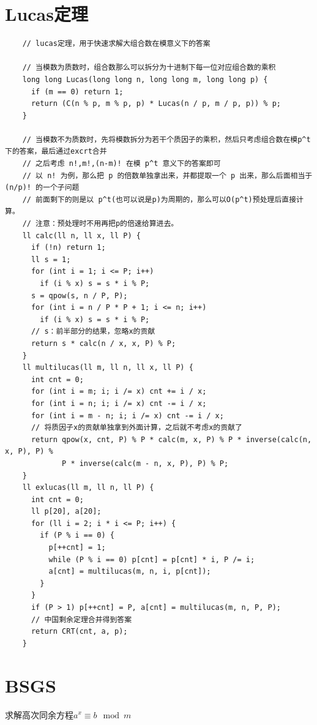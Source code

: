 \documentclass[a4paper,11pt,twoside,fontset = fandol,UTF8]{ctexbook} %
\begin{document}
	\section{Lucas定理}
	
	\begin{lstlisting}
	// lucas定理，用于快速求解大组合数在模意义下的答案
	
	// 当模数为质数时，组合数那么可以拆分为十进制下每一位对应组合数的乘积
	long long Lucas(long long n, long long m, long long p) {
	  if (m == 0) return 1;
	  return (C(n % p, m % p, p) * Lucas(n / p, m / p, p)) % p;
	}
	
	// 当模数不为质数时，先将模数拆分为若干个质因子的乘积，然后只考虑组合数在模p^t下的答案，最后通过excrt合并
	// 之后考虑 n!,m!,(n-m)! 在模 p^t 意义下的答案即可
	// 以 n! 为例，那么把 p 的倍数单独拿出来，并都提取一个 p 出来，那么后面相当于 (n/p)! 的一个子问题
	// 前面剩下的则是以 p^t(也可以说是p)为周期的，那么可以O(p^t)预处理后直接计算。
	// 注意：预处理时不用再把p的倍速给算进去。
	ll calc(ll n, ll x, ll P) {
	  if (!n) return 1;
	  ll s = 1;
	  for (int i = 1; i <= P; i++)
	    if (i % x) s = s * i % P;
	  s = qpow(s, n / P, P);
	  for (int i = n / P * P + 1; i <= n; i++)
	    if (i % x) s = s * i % P;
	  // s：前半部分的结果，忽略x的贡献
	  return s * calc(n / x, x, P) % P;
	}
	ll multilucas(ll m, ll n, ll x, ll P) {
	  int cnt = 0;
	  for (int i = m; i; i /= x) cnt += i / x;
	  for (int i = n; i; i /= x) cnt -= i / x;
	  for (int i = m - n; i; i /= x) cnt -= i / x;
	  // 将质因子x的贡献单独拿到外面计算，之后就不考虑x的贡献了
	  return qpow(x, cnt, P) % P * calc(m, x, P) % P * inverse(calc(n, x, P), P) %
	         P * inverse(calc(m - n, x, P), P) % P;
	}
	ll exlucas(ll m, ll n, ll P) {
	  int cnt = 0;
	  ll p[20], a[20];
	  for (ll i = 2; i * i <= P; i++) {
	    if (P % i == 0) {
	      p[++cnt] = 1;
	      while (P % i == 0) p[cnt] = p[cnt] * i, P /= i;
	      a[cnt] = multilucas(m, n, i, p[cnt]);
	    }
	  }
	  if (P > 1) p[++cnt] = P, a[cnt] = multilucas(m, n, P, P);
	  // 中国剩余定理合并得到答案
	  return CRT(cnt, a, p);
	}
	\end{lstlisting}
	
	\section{BSGS}
	求解高次同余方程$a^x\equiv b\mod m$
	
\end{document}
